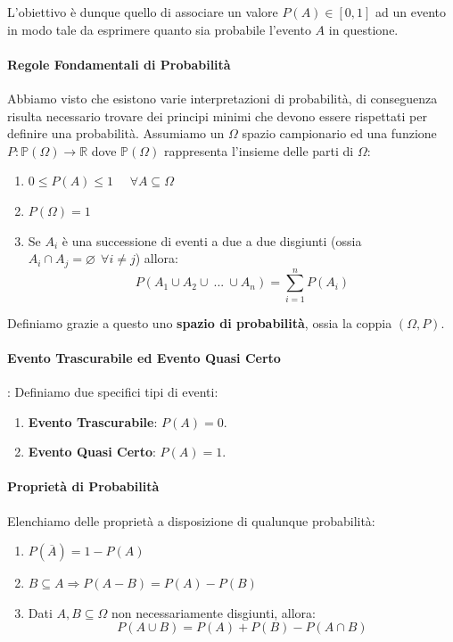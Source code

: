 \documentclass{article}
\begin{document}
L'obiettivo è dunque quello di associare un valore $P(A) \in [0,1]$ ad un evento in modo tale da esprimere quanto sia probabile l'evento $A$ in questione.

\newpage

\paragraph{Regole Fondamentali di Probabilità} Abbiamo visto che esistono varie interpretazioni di probabilità, di conseguenza risulta necessario trovare dei principi minimi che devono essere rispettati
per definire una probabilità. Assumiamo un $\Omega$ spazio campionario ed una funzione $P:\mathbb{P}(\Omega) \rightarrow \mathbb{R}$ dove $\mathbb{P}(\Omega)$ rappresenta l'insieme delle parti di $\Omega$:

\begin{enumerate}
    \item $0 \leq P(A) \leq 1 \:\:\:\:\:\: \forall A \subseteq \Omega$
    \item $P(\Omega) = 1$
    \item Se $A_{i}$ è una successione di eventi a due a due disgiunti (ossia $A_{i} \cap A_{j} = \varnothing \:\: \forall i \neq j$) allora:
    \vspace*{5px}
    \[ P(A_{1} \cup A_{2} \cup \: ... \: \cup A_{n}) = \sum_{i=1}^{n} P(A_{i}) \]
\end{enumerate}

Definiamo grazie a questo uno \textbf{spazio di probabilità}, ossia la coppia $(\Omega, P)$.

\paragraph{Evento Trascurabile ed Evento Quasi Certo}: Definiamo due specifici tipi di eventi:

\begin{enumerate}
    \item \textbf{Evento Trascurabile}: $P(A) = 0$.
    \item \textbf{Evento Quasi Certo}: $P(A) = 1$.
\end{enumerate}

\paragraph{Proprietà di Probabilità} Elenchiamo delle proprietà a disposizione di qualunque probabilità:

\begin{enumerate}
    \item $P(\overline{A}) = 1 - P(A)$
    \item $B \subseteq A \Rightarrow P(A-B) = P(A) - P(B)$
    \item Dati $A,B \subseteq \Omega$ non necessariamente disgiunti, allora:
    \[ P(A \cup B) = P(A) + P(B) - P(A \cap B) \]
\end{enumerate}
\end{document}
